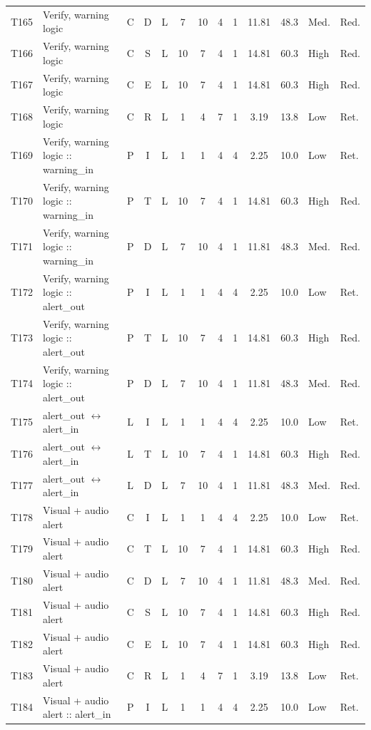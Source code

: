 \documentclass[9pt]{extarticle}
\begin{document}
\begin{longtable}{l>{\raggedright\arraybackslash}p{6.3cm}ccccccccrll}
T165 & Verify, warning logic & C & D & L & 7 & 10 & 4 & 1 & 11.81 & 48.3 & Med. & Red. \\
T166 & Verify, warning logic & C & S & L & 10 & 7 & 4 & 1 & 14.81 & 60.3 & High & Red. \\
T167 & Verify, warning logic & C & E & L & 10 & 7 & 4 & 1 & 14.81 & 60.3 & High & Red. \\
T168 & Verify, warning logic & C & R & L & 1 & 4 & 7 & 1 & 3.19 & 13.8 & Low & Ret. \\
T169 & Verify, warning logic :: warning\_in & P & I & L & 1 & 1 & 4 & 4 & 2.25 & 10.0 & Low & Ret. \\
T170 & Verify, warning logic :: warning\_in & P & T & L & 10 & 7 & 4 & 1 & 14.81 & 60.3 & High & Red. \\
T171 & Verify, warning logic :: warning\_in & P & D & L & 7 & 10 & 4 & 1 & 11.81 & 48.3 & Med. & Red. \\
T172 & Verify, warning logic :: alert\_out & P & I & L & 1 & 1 & 4 & 4 & 2.25 & 10.0 & Low & Ret. \\
T173 & Verify, warning logic :: alert\_out & P & T & L & 10 & 7 & 4 & 1 & 14.81 & 60.3 & High & Red. \\
T174 & Verify, warning logic :: alert\_out & P & D & L & 7 & 10 & 4 & 1 & 11.81 & 48.3 & Med. & Red. \\
T175 & alert\_out $\leftrightarrow$ alert\_in & L & I & L & 1 & 1 & 4 & 4 & 2.25 & 10.0 & Low & Ret. \\
T176 & alert\_out $\leftrightarrow$ alert\_in & L & T & L & 10 & 7 & 4 & 1 & 14.81 & 60.3 & High & Red. \\
T177 & alert\_out $\leftrightarrow$ alert\_in & L & D & L & 7 & 10 & 4 & 1 & 11.81 & 48.3 & Med. & Red. \\
T178 & Visual + audio alert & C & I & L & 1 & 1 & 4 & 4 & 2.25 & 10.0 & Low & Ret. \\
T179 & Visual + audio alert & C & T & L & 10 & 7 & 4 & 1 & 14.81 & 60.3 & High & Red. \\
T180 & Visual + audio alert & C & D & L & 7 & 10 & 4 & 1 & 11.81 & 48.3 & Med. & Red. \\
T181 & Visual + audio alert & C & S & L & 10 & 7 & 4 & 1 & 14.81 & 60.3 & High & Red. \\
T182 & Visual + audio alert & C & E & L & 10 & 7 & 4 & 1 & 14.81 & 60.3 & High & Red. \\
T183 & Visual + audio alert & C & R & L & 1 & 4 & 7 & 1 & 3.19 & 13.8 & Low & Ret. \\
T184 & Visual + audio alert :: alert\_in & P & I & L & 1 & 1 & 4 & 4 & 2.25 & 10.0 & Low & Ret. \\

\end{longtable}
\end{document}
